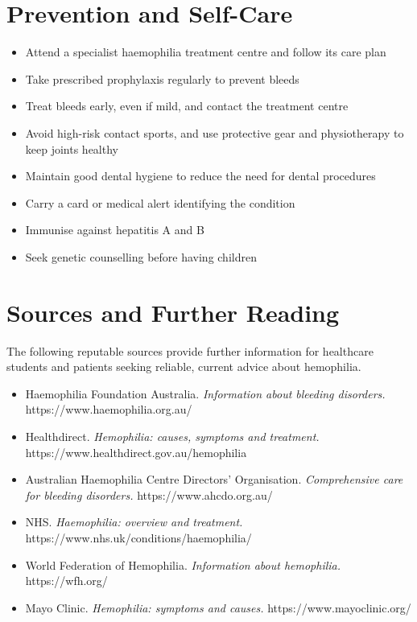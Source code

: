 \section*{Prevention and Self-Care}
\begin{itemize}
    \item Attend a specialist haemophilia treatment centre and follow its care plan
    \item Take prescribed prophylaxis regularly to prevent bleeds
    \item Treat bleeds early, even if mild, and contact the treatment centre
    \item Avoid high-risk contact sports, and use protective gear and physiotherapy to keep joints healthy
    \item Maintain good dental hygiene to reduce the need for dental procedures
    \item Carry a card or medical alert identifying the condition
    \item Immunise against hepatitis A and B
    \item Seek genetic counselling before having children
\end{itemize}

\section*{Sources and Further Reading}
The following reputable sources provide further information for healthcare students and patients seeking reliable, current advice about hemophilia.

\begin{itemize}
    \item Haemophilia Foundation Australia. \textit{Information about bleeding disorders.} https://www.haemophilia.org.au/
    \item Healthdirect. \textit{Hemophilia: causes, symptoms and treatment.} https://www.healthdirect.gov.au/hemophilia
    \item Australian Haemophilia Centre Directors' Organisation. \textit{Comprehensive care for bleeding disorders.} https://www.ahcdo.org.au/
    \item NHS. \textit{Haemophilia: overview and treatment.} https://www.nhs.uk/conditions/haemophilia/
    \item World Federation of Hemophilia. \textit{Information about hemophilia.} https://wfh.org/
    \item Mayo Clinic. \textit{Hemophilia: symptoms and causes.} https://www.mayoclinic.org/
\end{itemize}
